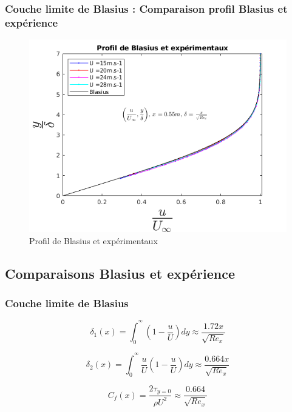 \documentclass{beamer}
\begin{document}
\begin{frame}
\frametitle{Couche limite de Blasius : Comparaison profil Blasius et expérience}
\begin{figure}[ht]
	\centering
	\includegraphics[scale = 0.4]{./image/Bla.png}
	\caption{Profil de Blasius et expérimentaux}
\end{figure}
\end{frame}
\subsection{Comparaisons Blasius et expérience}\label{sec:comparaison}
\begin{frame}
\frametitle{Couche limite de Blasius}
\begin{equation}
	\delta_{1}(x) = 
	\int_{0}^{^\infty}
	\left(
	1 - 
	\frac{u}{U}
	\right)
	dy
	\approx \frac{1.72x}{\sqrt{Re_{x}}}
\end{equation}

\begin{equation}
	\delta_{2}(x) = 
	\int_{0}^{^\infty}
	\frac{u}{U}
	\left(
	1 - 
	\frac{u}{U}
	\right)
	dy
	\approx \frac{0.664x}{\sqrt{Re_{x}}}
\end{equation}

\begin{equation}
	C_{f}(x) =
	\frac{2\tau_{y=0}}{\rho U^{2}} 
	 \approx \frac{0.664}{\sqrt{Re_{x}}}
\end{equation}
\end{frame}
\end{document}
